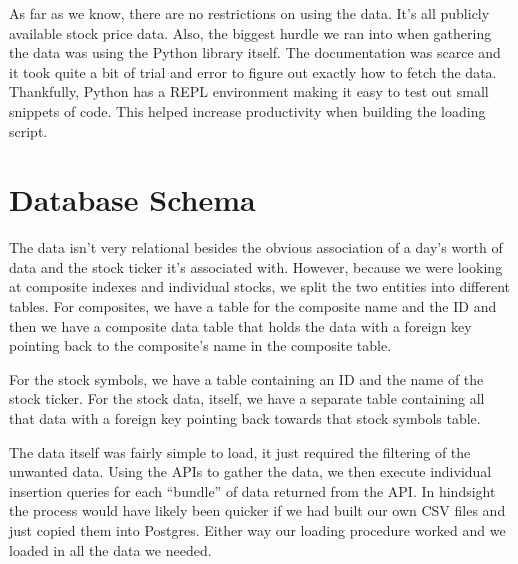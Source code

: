 \documentclass{article}
\begin{document}
    As far as we know, there are no restrictions on using the data. It's all publicly available
    stock price data. Also, the biggest hurdle we ran into when gathering the data was using the
    Python library itself. The documentation was scarce and it took quite a bit of trial and error
    to figure out exactly how to fetch the data. Thankfully, Python has a REPL environment making it
    easy to test out small snippets of code. This helped increase productivity when building the
    loading script.
    \section*{Database Schema}
    The data isn't very relational besides the obvious association of a day's worth of data and the
    stock ticker it's associated with. However, because we were looking at composite indexes and
    individual stocks, we split the two entities into different tables. For composites, we have a
    table for the composite name and the ID and then we have a composite data table that holds
    the data with a foreign key pointing back to the composite's name in the composite table.

    For the stock symbols, we have a table containing an ID and the name of the stock ticker. For
    the stock data, itself, we have a separate table containing all that data with a foreign key
    pointing back towards that stock symbols table.

    The data itself was fairly simple to load, it just required the filtering of the unwanted
    data. Using the APIs to gather the data, we then execute individual insertion queries for
    each ``bundle'' of data returned from the API. In hindsight the process would have likely
    been quicker if we had built our own CSV files and just copied them into Postgres. Either way
    our loading procedure worked and we loaded in all the data we needed.
\end{document}
